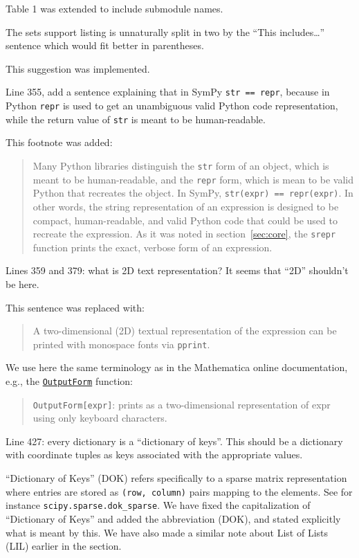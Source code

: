 \documentclass[answers,12pt]{exam}
\begin{document}
\begin{questions}
\begin{solution}
Table 1 was extended to include submodule names.
\end{solution}

\question The sets support listing is unnaturally split in two by the ``This includes\ldots'' sentence which would fit better in parentheses.
\begin{solution}
This suggestion was implemented.
\end{solution}

\question Line 355, add a sentence explaining that in SymPy \texttt{str == repr}, because in Python \texttt{repr} is used to get an unambiguous valid Python code representation, while the return value of \texttt{str} is meant to be human-readable.
\begin{solution}
This footnote was added:
\begin{quote}
  Many Python libraries distinguish the \texttt{str} form of an object, which
  is meant to be human-readable, and the \texttt{repr} form, which is mean to
  be valid Python that recreates the object. In SymPy, \texttt{str(expr) ==
    repr(expr)}. In other words, the string representation of an expression is
  designed to be compact, human-readable, and valid Python code that could be
  used to recreate the expression. As it was noted in section~\ref{sec:core},
  the \texttt{srepr} function prints the exact, verbose form of an expression.
\end{quote}
\end{solution}

\question Lines 359 and 379: what is 2D text representation? It seems that ``2D'' shouldn't be here.
\begin{solution}
This sentence was replaced with:
\begin{quote}
A two-dimensional (2D) textual representation of the expression can
be printed with monospace fonts via \verb|pprint|.
\end{quote}
We use here the same terminology as in the Mathematica
online documentation, e.g., the
\href{https://reference.wolfram.com/language/ref/OutputForm.html}{\texttt{OutputForm}}
function:
\begin{quote}
\texttt{OutputForm[expr]}: prints as a two-dimensional representation of expr using only keyboard characters.
\end{quote}
\end{solution}

\question Line 427: every dictionary is a ``dictionary of keys''. This should be a dictionary with coordinate tuples as keys associated with the appropriate values.
\begin{solution}
``Dictionary of Keys'' (DOK) refers specifically to a sparse matrix
representation where entries are stored as \texttt{(row, column)} pairs
mapping to the elements. See for instance \texttt{scipy.sparse.dok\_sparse}. We
have fixed the capitalization of ``Dictionary of Keys'' and added the
abbreviation (DOK), and stated explicitly what is meant by this. We have also
made a similar note about List of Lists (LIL) earlier in the section.
\end{solution}


\end{questions}
\end{document}
